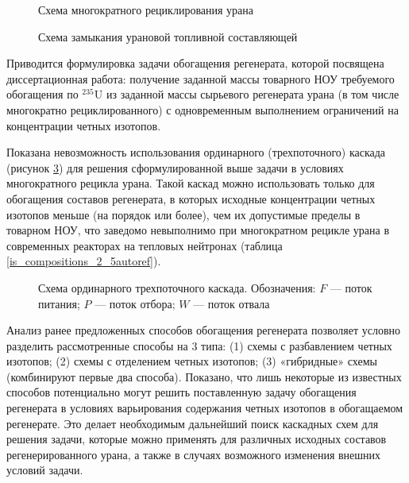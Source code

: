 \begin{figure}[ht]
  \caption{Схема многократного рециклирования урана}\label{fig_autoref1}
\end{figure}

\begin{figure}[ht]
  \caption{Схема замыкания урановой топливной составляющей}\label{fig_autoref2}
\end{figure}

Приводится формулировка задачи обогащения регенерата, которой посвящена диссертационная работа: получение заданной массы товарного НОУ требуемого обогащения по $^{235}$U из заданной массы сырьевого регенерата урана (в том числе многократно рециклированного) с одновременным выполнением ограничений на концентрации четных изотопов. 

Показана невозможность использования ординарного (трехпоточного) каскада (рисунок \ref{ordinary}) для решения сформулированной выше задачи в условиях многократного рецикла урана. Такой каскад можно использовать только для обогащения составов регенерата, в которых исходные концентрации четных изотопов меньше (на порядок или более), чем их допустимые пределы в товарном НОУ, что заведомо невыполнимо при многократном рецикле урана в современных реакторах на тепловых нейтронах (таблица \ref{is_compositions_2_5autoref}).

\begin{figure}[ht]
  \caption{Схема ординарного трехпоточного каскада. Обозначения: $F$ --- поток питания; $P$ --- поток отбора; $W$ --- поток отвала}\label{ordinary}
\end{figure}

Анализ ранее предложенных способов обогащения регенерата позволяет условно разделить рассмотренные способы на 3 типа: (1) схемы с разбавлением четных изотопов; (2) схемы с отделением четных изотопов; (3) «гибридные» схемы (комбинируют первые два способа).
Показано, что лишь некоторые из известных способов потенциально могут решить поставленную задачу обогащения регенерата в условиях варьирования содержания четных изотопов в обогащаемом регенерате. Это делает необходимым дальнейший поиск каскадных схем для решения задачи, которые можно применять для различных исходных составов регенерированного урана, а также в случаях возможного изменения внешних условий задачи. 

